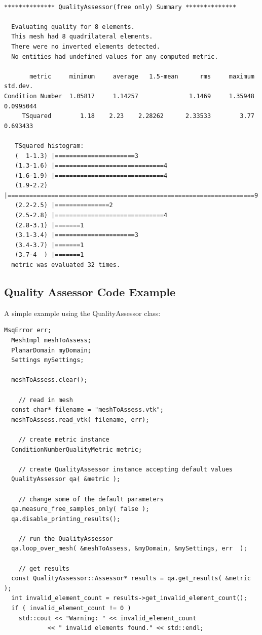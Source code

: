 \begin{verbatim}

************** QualityAssessor(free only) Summary **************

  Evaluating quality for 8 elements.
  This mesh had 8 quadrilateral elements.
  There were no inverted elements detected.
  No entities had undefined values for any computed metric.

       metric	  minimum     average	1.5-mean	  rms	  maximum    std.dev.
Condition Number  1.05817     1.14257		       1.1469	  1.35948   0.0995044
     TSquared	     1.18	 2.23	 2.28262      2.33533	     3.77    0.693433

   TSquared histogram:
   (  1-1.3) |======================3
   (1.3-1.6) |==============================4
   (1.6-1.9) |==============================4
   (1.9-2.2) |====================================================================9
   (2.2-2.5) |===============2
   (2.5-2.8) |==============================4
   (2.8-3.1) |=======1
   (3.1-3.4) |======================3
   (3.4-3.7) |=======1
   (3.7-4  ) |=======1
  metric was evaluated 32 times.

\end{verbatim}

\clearpage
\subsection{Quality Assessor Code Example}

A simple example using the QualityAssessor class:

\begin{lstlisting}[frame=single]
  MsqError err;
  MeshImpl meshToAssess;
  PlanarDomain myDomain;
  Settings mySettings;

  meshToAssess.clear();

    // read in mesh
  const char* filename = "meshToAssess.vtk";
  meshToAssess.read_vtk( filename, err);

    // create metric instance
  ConditionNumberQualityMetric metric;

    // create QualityAssessor instance accepting default values
  QualityAssessor qa( &metric );

    // change some of the default parameters
  qa.measure_free_samples_only( false );
  qa.disable_printing_results();

    // run the QualityAssessor
  qa.loop_over_mesh( &meshToAssess, &myDomain, &mySettings, err	 );

    // get results
  const QualityAssessor::Assessor* results = qa.get_results( &metric );
  int invalid_element_count = results->get_invalid_element_count();
  if ( invalid_element_count != 0 )
    std::cout << "Warning: " << invalid_element_count
			<< " invalid elements found." << std::endl;
\end{lstlisting}

